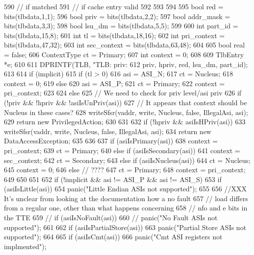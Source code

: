 \begin{DoxyCode}
{{{{{590                 } // if matched
591             } // if cache entry valid
592         }
593     }
594 
595     bool red = bits(tlbdata,1,1);
596     bool priv = bits(tlbdata,2,2);
597     bool addr_mask = bits(tlbdata,3,3);
598     bool lsu_dm = bits(tlbdata,5,5);
599 
600     int part_id = bits(tlbdata,15,8);
601     int tl = bits(tlbdata,18,16);
602     int pri_context = bits(tlbdata,47,32);
603     int sec_context = bits(tlbdata,63,48);
604 
605     bool real = false;
606     ContextType ct = Primary;
607     int context = 0;
608 
609     TlbEntry *e;
610 
611     DPRINTF(TLB, "TLB: priv:%
612             priv, hpriv, red, lsu_dm, part_id);
613 
614     if (implicit) {
615         if (tl > 0) {
616             asi = ASI_N;
617             ct = Nucleus;
618             context = 0;
619         } else {
620             asi = ASI_P;
621             ct = Primary;
622             context = pri_context;
623         }
624     } else {
625         // We need to check for priv level/asi priv
626         if (!priv && !hpriv && !asiIsUnPriv(asi)) {
627             // It appears that context should be Nucleus in these cases?
628             writeSfsr(vaddr, write, Nucleus, false, IllegalAsi, asi);
629             return new PrivilegedAction;
630         }
631 
632         if (!hpriv && asiIsHPriv(asi)) {
633             writeSfsr(vaddr, write, Nucleus, false, IllegalAsi, asi);
634             return new DataAccessException;
635         }
636 
637         if (asiIsPrimary(asi)) {
638             context = pri_context;
639             ct = Primary;
640         } else if (asiIsSecondary(asi)) {
641             context = sec_context;
642             ct = Secondary;
643         } else if (asiIsNucleus(asi)) {
644             ct = Nucleus;
645             context = 0;
646         } else {  // ????
647             ct = Primary;
648             context = pri_context;
649         }
650     }
651 
652     if (!implicit && asi != ASI_P && asi != ASI_S) {
653         if (asiIsLittle(asi))
654             panic("Little Endian ASIs not supported\n");
655 
656         //XXX It's unclear from looking at the documentation how a no fault
657         // load differs from a regular one, other than what happens concerning
658         // nfo and e bits in the TTE
659 //        if (asiIsNoFault(asi))
660 //            panic("No Fault ASIs not supported\n");
661 
662         if (asiIsPartialStore(asi))
663             panic("Partial Store ASIs not supported\n");
664 
665         if (asiIsCmt(asi))
666             panic("Cmt ASI registers not implmented\n");
}}
\end{DoxyCode}

